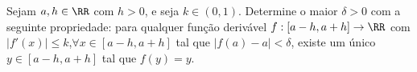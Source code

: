 Sejam $a, h \in \RR$ com $h > 0$, e seja $k \in (0,1)$. Determine o maior $\delta > 0$ com a seguinte propriedade: para qualquer função derivável $f : [a-h,a+h] \to \RR$ com $|f'(x)| \le k$,$ \forall x \in [a-h,a+h]$ tal que $|f(a) - a| < \delta$, existe um único $y \in [a-h,a+h]$ tal que $f(y) = y$.